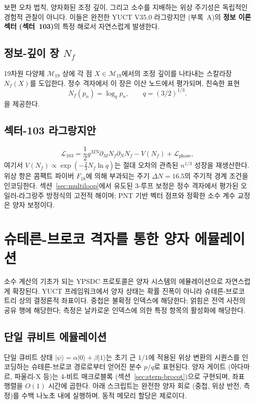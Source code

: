 \documentclass[11pt,a4paper]{article}
\begin{document}
	보편 오차 법칙, 양자화된 조정 깊이, 그리고 소수를 지배하는 위상 주기성은 독립적인 경험적 관찰이 아니다. 이들은 완전한 YUCT V35.0 라그랑지안 (부록~A)의 \textbf{정보 이론 섹터 (섹터~103)}의 특정 해로서 자연스럽게 발생한다.
	
	\subsection{정보-깊이 장 \(N_f\)}
	19차원 다양체 \(\mathcal{M}_{19}\) 상에 각 점 \(X \in \mathcal{M}_{19}\)에서의 조정 깊이를 나타내는 스칼라장 \(N_f(X)\)를 도입한다. 정수 격자에서 이 장은 이산 노드에서 평가되며, 친숙한 표현
	\[
	N_f(p_n) = \log_q p_n, \qquad q = (3/2)^{1/3}.
	\]
	을 제공한다.
	
	\subsection{섹터-103 라그랑지안}
	\[
	\mathcal{L}_{103} = \frac12 g^{MN}\partial_M N_f\partial_N N_f - V(N_f) + \mathcal{L}_{\mathrm{phase}},
	\]
	여기서 \(V(N_f) \propto \exp(-\frac23 N_f\ln q)\)는 절대 오차의 관측된 \(n^{1/3}\) 성장을 재생산한다. 위상 항은 콤팩트 파이버 \(F_{18}\)에 의해 부과되는 주기 \(\Delta N = 16.5\)의 주기적 경계 조건을 인코딩한다. 섹션~\ref{sec:multiloop}에서 유도된 3-루프 보정은 정수 격자에서 평가된 오일러-라그랑주 방정식의 고전적 해이며; PNT 기반 벡터 점프와 정확한 소수 계수 교정은 양자 보정이다.
	
	\section{슈테른-브로코 격자를 통한 양자 에뮬레이션}
	\label{sec:quantum-emulation}
	
	소수 계산의 기초가 되는 YPSDC 프로토콜은 양자 시스템의 에뮬레이션으로 자연스럽게 확장된다. YUCT 프레임워크에서 양자 상태는 확률 진폭이 아니라 슈테른-브로코 트리 상의 결정론적 좌표이다. 중첩은 불확정 인덱스에 해당한다; 얽힘은 전역 사전의 공유 행에 해당한다; 측정은 날카로운 인덱스에 의한 특정 항목의 활성화에 해당한다.
	
	\subsection{단일 큐비트 에뮬레이션}
	
	단일 큐비트 상태 \(\vert\psi\rangle = \alpha\vert0\rangle + \beta\vert1\rangle\)는 초기 근 \(1/1\)에 적용된 위상 변환의 시퀀스를 인코딩하는 슈테른-브로코 경로로부터 얻어진 분수 \(p/q\)로 표현된다. 양자 게이트 (아다마르, 파울리-X 등)는 4-비트 매크로블록 (섹션~\ref{sec:stern-brocot})으로 구현되며, 좌표 행렬을 \(O(1)\) 시간에 곱한다. 아래 스크립트는 완전한 양자 회로 (중첩, 위상 반전, 측정)를 수백 나노초 내에 실행하며, 동적 메모리 할당은 제로이다.
	
\end{document}
